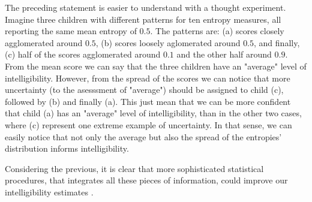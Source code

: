 The preceding statement is easier to understand with a thought experiment. Imagine three children with different patterns for ten entropy measures, all reporting the same mean entropy of $0.5$. The patterns are: (a) scores closely agglomerated around $0.5$, (b) scores loosely aglomerated around $0.5$, and finally, (c) half of the scores agglomerated around $0.1$ and the other half around $0.9$. From the mean score we can say that the three children have an "average" level of intelligibility. However, from the spread of the scores we can notice that more uncertainty (to the asesssment of "average") should be assigned to child (c), followed by (b) and finally (a). This just mean that we can be more confident that child (a) has an "average" level of intelligibility, than in the other two cases, where (c) represent one extreme example of uncertainty. In that sense, we can easily notice that not only the average but also the spread of the entropies' distribution informs intelligibility.

Considering the previous, it is clear that more sophisticated statistical procedures, that integrates all these pieces of information, could improve our intelligibility estimates \citep{McElreath_2020}.

\begin{comment}
	
	First, as previous paragraphs reveal, the intelligibility scores are `complex' in nature, however, such `complexity' is rarely fully considered in the statistical modeling procedure. The problem with the later is that, because the data does not fulfill the typical assumptions, e.g. normality, its analysis under such models might lead us to erroneous conclusions \textcolor{red}{[citation]}. On the one hand, outcomes such as the number of (un)intelligible words are discrete, while the entropy scores are continuous in nature. In addition, there is the consideration that both scores are constraint in specific bounds, i.e. the number of (un)intelligible words cannot be negative, while the entropy scores are in the bounds between zero and one. Finally, given the rating procedure's nature, the scores are produced in a clustered manner, i.e. we observe several score measurements per child. 
	
	So far the literature shows that, even when the data does not conform to the `normality' assumption, the applied statistical procedures are still supported on it, examples of this can be seen in \citep{Boonen_et_al_2021, Flipsen_et_al_2006} and \citep{Hustad_et_al_2020}. In addition, some papers in the literature have even used (hierarchical) multilevel modeling to deal with the clustered nature of the data, e.g. \citep{Boonen_et_al_2021}. However, to the authors knowledge, no paper have dealt with all of the data nuances at once, which leads us to believe that, by using more sophisticated statistical models we could improve our statistical inferences. 

\end{comment}

